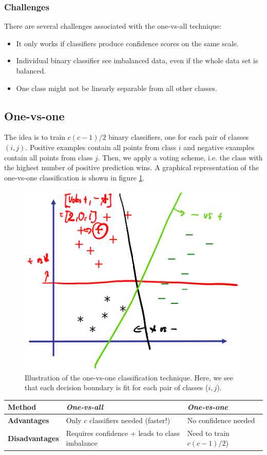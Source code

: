 \documentclass[a4paper,10pt,twoside]{article}
\begin{document}
\subsubsection{Challenges}
There are several challenges associated with the one-vs-all technique:
\begin{itemize}
    \item It only works if classifiers produce confidence scores on the same scale.
    \item Individual binary classifier see imbalanced data, even if the whole data set is balanced.
    \item One class might not be linearly separable from all other classes.
\end{itemize}

\subsection{One-vs-one}

The idea is to train $c(c-1)/2$ binary classifiers, one for each pair of classes $(i,j)$. Positive examples contain all points from class $i$ and negative examples contain all points from class $j$. Then, we apply a voting scheme, i.e. the class with the highest number of positive prediction wins. A graphical representation of the one-vs-one classification is shown in figure \ref{one-vs-one}.

\begin{figure}
    \centering
    \includegraphics[width=.5\textwidth]{figures/one-vs-one.png}
    \caption{Illustration of the one-vs-one classification technique. Here, we see that each decision boundary is fit for each pair of classes ($i,j$).}
    \label{one-vs-one}
\end{figure}

\begin{table}
    \centering
    \begin{tabular}{lll}
        \toprule
        \textbf{Method} & \textit{One-vs-all} & \textit{One-vs-one} \\ 
        \midrule
        \textbf{Advantages} & Only $c$ classifiers needed (faster!) & No confidence needed\\
        \textbf{Disadvantages} & Requires confidence + leads to class imbalance & Need to train $c(c-1)/2$)\\
        \bottomrule
    \end{tabular}
\end{table}
\end{document}
